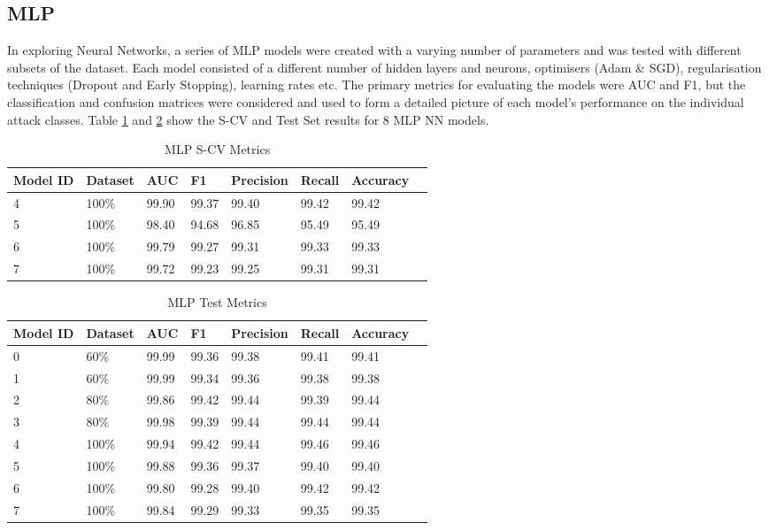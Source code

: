 \subsection{MLP}

In exploring Neural Networks, a series of MLP models were created with a varying number of parameters and was tested with different subsets of the dataset. Each model consisted of a different number of hidden layers and neurons, optimisers (Adam \& SGD), regularisation techniques (Dropout and Early Stopping), learning rates etc. The primary metrics for evaluating the models were AUC and F1, but the classification and confusion matrices were considered and used to form a detailed picture of each model's performance on the individual attack classes. Table \ref{tab:mlp-scv-metrics} and \ref{tab:mlp-test-metrics} show the S-CV and Test Set results for 8 MLP NN models. 

\begin{table}[h]
\centering
\caption{MLP S-CV Metrics}
\label{tab:mlp-scv-metrics}
\begin{tabular}{|l|l|l|l|l|l|l|l|}
\hline
\textbf{Model ID} & \textbf{Dataset} & \textbf{AUC} & \textbf{F1} & \textbf{Precision} & \textbf{Recall} & \textbf{Accuracy}  \\ \hline
4 & 100\% & 99.90 & 99.37 & 99.40 & 99.42 & 99.42 \\ \hline
5 & 100\% & {\color{red} 98.40} & {\color{red} 94.68} & {\color{red} 96.85} & {\color{red} 95.49} & {\color{red} 95.49} \\ \hline
6 & 100\% & 99.79 & 99.27 & 99.31 & 99.33 & 99.33 \\ \hline
7 & 100\% & 99.72 & 99.23 & 99.25 & 99.31 & 99.31 \\ \hline

\end{tabular}
\end{table}

\begin{table}[H]
\centering
\caption{MLP Test Metrics}
\label{tab:mlp-test-metrics}
\begin{tabular}{|l|l|l|l|l|l|l|l|}
\hline
\textbf{Model ID} & \textbf{Dataset} & \textbf{AUC} & \textbf{F1} & \textbf{Precision} & \textbf{Recall} & \textbf{Accuracy}  \\ \hline
0 & 60\% & 99.99 & 99.36 & 99.38 & 99.41 & 99.41 \\ \hline
1 & 60\% & 99.99 & 99.34 & 99.36 & 99.38 & 99.38 \\ \hline
2 & 80\% & 99.86 & 99.42 & 99.44 & 99.39 & 99.44 \\ \hline
3 & 80\% & 99.98 & 99.39 & 99.44 & 99.44 & 99.44 \\ \hline
4 & 100\% & 99.94 & 99.42 & 99.44 & 99.46 & 99.46 \\ \hline
5 & 100\% & 99.88 & 99.36 & 99.37 & 99.40 & 99.40 \\ \hline
6 & 100\% & 99.80 & 99.28 & 99.40 & 99.42 & 99.42 \\ \hline
7 & 100\% & 99.84 & 99.29 & 99.33 & 99.35 & 99.35 \\ \hline
\end{tabular}
\end{table}

